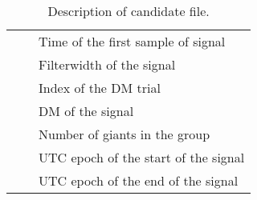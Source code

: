 \begin{table}[]
\begin{tabular}{lll}
																																																									&                                                            & Time of the first sample of signal                                                                                   \\
																																																									&                                                            & Filterwidth of the signal                                                                                            \\
																																																									&                                                            & Index of the DM trial                                                                                                \\
																																																									&                                                            & DM of the signal                                                                                                     \\
																																																									&                                                            & Number of giants in the group                                                                                        \\
																																																									&                                                            & UTC epoch of the start of the signal                                                                                 \\
																																																									&                                                            & UTC epoch of the end of the signal                                                                                 \\ 
		\bottomrule
 \end{tabular}
	\caption{Description of candidate file.}
\end{table}
